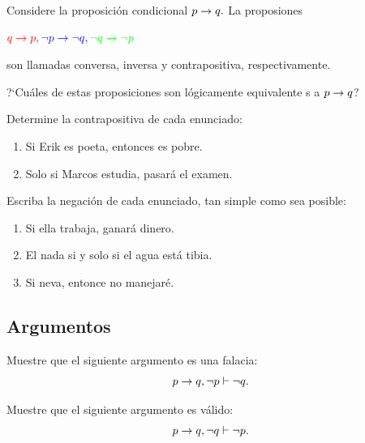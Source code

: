  \begin{problema}
  \label{lip:sol:4.7}
  Considere la proposici\'on condicional $p \rightarrow q.$ La proposiones 
  \begin{center}
  ${\color{red}q \rightarrow p,} {\color{blue}\, \neg p \rightarrow \neg q,} \, {\color{green}\neg q \rightarrow \neg p}$
  \end{center}
son llamadas {\color{red} conversa,} {\color{blue}inversa} y {\color{green} contrapositiva}, respectivamente.


?`Cu\'ales de estas proposiciones son l\'ogicamente equivalente s a $p\rightarrow q$?
 \end{problema}




 \begin{problema}
  Determine la contrapositiva de cada enunciado:
  \begin{enumerate}
   \item Si Erik es poeta, entonces es pobre. 
   \item Solo si Marcos estudia, pasar\'a el examen. 
  \end{enumerate}

 \end{problema}




 \begin{problema}
  Escriba la negaci\'on de cada enunciado, tan simple como sea posible:
  \begin{enumerate}
   \item Si ella trabaja, ganar\'a dinero. 
   \item El nada si y solo si el agua est\'a tibia. 
   \item Si neva, entonce no manejar\'e.
  \end{enumerate}

 \end{problema}



\subsection{Argumentos}


 \begin{problema}
  Muestre que el siguiente argumento es una falacia:
 $$
 p\rightarrow q, \neg p \vdash \neg q.
 $$
 \end{problema}




 \begin{problema}
  Muestre que el siguiente argumento es v\'alido:
 $$
 p\rightarrow q, \neg q \vdash \neg p.
 $$
 \end{problema}




